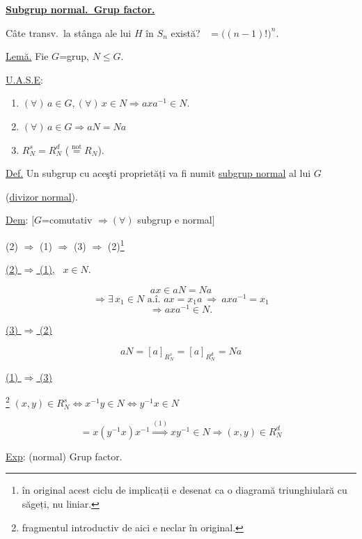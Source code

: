 \noindent\underline{\textbf{Subgrup normal.\ Grup factor.}}

\bigskip
\noindent Câte transv.\ la stânga ale lui $H$ în $S_n$ există? \ $=\big((n-1)!\big)^n$.

\bigskip
\noindent\underline{Lemă.} Fie $G$=grup, $N\leq G$.

\noindent\underline{U.A.S.E}: 

\begin{enumerate}
\item[(1)] $(\forall)\, a\in G, (\forall)\, x\in N \Rightarrow axa^{-1}\in N$.
\item[(2)] $(\forall)\, a\in G \Rightarrow aN=Na$
\item[(3)] $R_N^s = R_N^d$ ($\overset{\text{not}}{=} R_N$).
\end{enumerate}

\noindent\underline{Def.}  Un subgrup cu aceşti proprietăți va fi numit \underline{subgrup normal} al lui $G$

\noindent (\underline{divizor normal}).

\bigskip
\noindent\underline{Dem}: $\big[G$=comutativ $\Rightarrow (\forall)$ subgrup e normal$\big]$

\bigskip
\begin{center}
(2) $\Rightarrow$ (1) $\Rightarrow$ (3) $\Rightarrow$ (2)\footnote{în original acest ciclu de implicații e desenat ca o diagramă triunghiulară cu săgeți, nu liniar.}
\end{center}

\bigskip
\noindent\underline{(2) $\Rightarrow$ (1)}, \ $x\in N$.

\[
ax\in aN=Na
\]
\[
\Rightarrow \exists\, x_1\in N \text{ a.î. } ax=x_1a \ \Rightarrow \ axa^{-1}=x_1
\]
\[
\Rightarrow axa^{-1}\in N.
\]

\bigskip
\noindent\underline{(3) $\Rightarrow$ (2)}

\[
aN = [a]_{R_N^s} = [a]_{R_N^d} = Na
\]

\bigskip
\noindent\underline{(1) $\Rightarrow$ (3)}

\noindent\footnote{fragmentul introductiv de aici e neclar în original.} $(x,y)\in R_N^s \Leftrightarrow x^{-1}y\in N \Leftrightarrow y^{-1}x\in N$

\[
= x(y^{-1}x)x^{-1} \overset{(1)}{\Longrightarrow} xy^{-1}\in N \Rightarrow (x,y)\in R_N^d
\]

\bigskip
\noindent\underline{Exp}: (normal) Grup factor.

